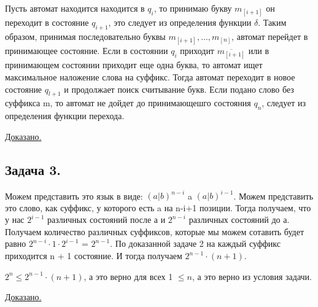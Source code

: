 \documentclass[a4paper,14pt]{article} %
\begin{document}
Пусть автомат находится находится в $q_i$, то принимаю букву $m_{[i+1]}$ он переходит в состояние $q_{i+1}$, это следует из определения функции $\delta$.
Таким образом, принимая последовательно буквы $m_{[i+1]}, ..., m_{[n]}$, автомат перейдет в принимающее состояние.
Если в состоянии $q_i$ приходит $\overline{m_{[i+1]}}$ или в принимающем состоянии приходит еще одна буква, то автомат ищет максимальное наложение слова на суффикс.
Тогда автомат переходит в новое состояние $q_{l+1}$ и продолжает поиск считывание букв. Если подано слово без суффикса m, то автомат не дойдет до принимающешго состояния $q_n$, следует из определения функции перехода.

\underline{Доказано.}

\subsection{Задача 3.}
Можем представить это язык в виде: $(a|b)^{n-i}$ a $(a|b)^{i-1}$.
Можем представить это слово, как суффикс, у которого есть a на n-i+1 позиции. Тогда получаем, что у нас $2^{i-1}$ различных состояний после а и $2^{n-i}$ различных состояний до а.
Получаем количество различных суффиксов, которые мы можем сотавить будет равно $2^{n-i} \cdot 1 \cdot 2^{i-1}$ = $2^{n-1}$. По доказанной задаче 2 на каждый суффикс приходится n + 1 состояние.
И тогда получаем $2^{n- 1} \cdot (n+1)$. 

$2^n \leq  2^{n-1} \cdot (n+1)$, а это верно для всех 1 $\leq n$, а это верно из условия задачи. 

\underline{Доказано.}
\end{document}
